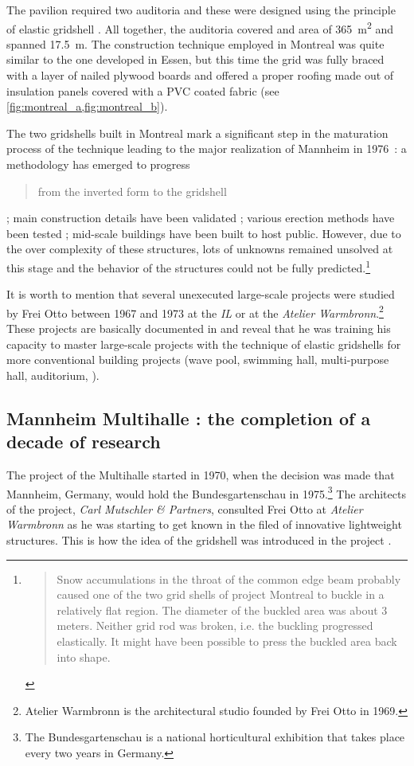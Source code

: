 The pavilion required two auditoria and these were designed using the principle of elastic gridshell \cite[p.~274]{IL10}. All together, the auditoria covered and area of \SI{365}{m^2} and spanned \SI{17.5}{m}. The construction technique employed in Montreal was quite similar to the one developed in Essen, but this time the grid was fully braced with a layer of nailed plywood boards and offered a proper roofing made out of insulation panels covered with a PVC coated fabric (see \cref{fig:montreal_a,fig:montreal_b}).

The two gridshells built in Montreal mark a significant step in the maturation process of the technique leading to the major realization of Mannheim in 1976~: a methodology has emerged to progress \blockcquote[p.~179]{IL10}{from the inverted form to the gridshell} ; main construction details have been validated ; various erection methods have been tested ; mid-scale buildings have been built to host public. However, due to the over complexity of these structures, lots of unknowns remained unsolved at this stage and the behavior of the structures could not be fully predicted.\footnote{\blockcquote[p.~219]{IL10}{Snow accumulations in the throat of the common edge beam probably caused one of the two grid shells of project Montreal to buckle in a relatively flat region. The diameter of the buckled area was about 3 meters. Neither grid rod was broken, i.e. the buckling progressed elastically. It might have been possible to press the buckled area back into shape.}}

It is worth to mention that several unexecuted large-scale projects were studied by Frei Otto between 1967 and 1973 at the \emph{IL} or at the \emph{Atelier Warmbronn}.\footnote{Atelier Warmbronn is the architectural studio founded by Frei Otto in 1969.} These projects are basically documented in \cite[pp.~278 - 288]{IL10} and reveal that he was training his capacity to master large-scale projects with the technique of elastic gridshells for more conventional building projects (wave pool, swimming hall, multi-purpose hall, auditorium, \telp{}).

\subsection{Mannheim Multihalle : the completion of a decade of research}
The project of the Multihalle started in 1970, when the decision was made that Mannheim, Germany, would hold the Bundesgartenschau in 1975.\footnote{The Bundesgartenschau is a national horticultural exhibition that takes place every two years in Germany.} The architects of the project, \emph{Carl Mutschler \& Partners}, consulted Frei Otto at \emph{Atelier Warmbronn} as he was starting to get known in the filed of innovative lightweight structures. This is how the idea of the gridshell was introduced in the project \cite{Liddell2015}. 

